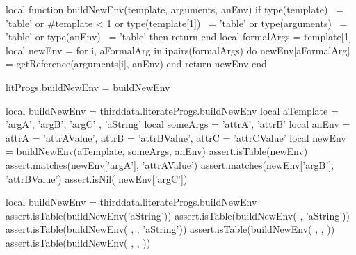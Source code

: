 {{\startLuaCode
local function buildNewEnv(template, arguments, anEnv)
  if type(template)    ~= 'table' or #template  < 1 or
     type(template[1]) ~= 'table' or
     type(arguments)   ~= 'table' or
     type(anEnv)       ~= 'table' then
    return { }
  end
  local formalArgs = template[1]
  local newEnv = { }
  for i, aFormalArg in ipairs(formalArgs) do
    newEnv[aFormalArg] = getReference(arguments[i], anEnv)
  end
  return newEnv
end

litProgs.buildNewEnv = buildNewEnv
\stopLuaCode

\startLuaTest
local buildNewEnv = thirddata.literateProgs.buildNewEnv
local aTemplate = { { 'argA', 'argB', 'argC' }, 'aString' }
local someArgs  = { 'attrA', 'attrB' }
local anEnv     = {
  attrA = 'attrAValue',
  attrB = 'attrBValue',
  attrC = 'attrCValue'
}
local newEnv = buildNewEnv(aTemplate, someArgs, anEnv)
assert.isTable(newEnv)
assert.matches(newEnv['argA'], 'attrAValue')
assert.matches(newEnv['argB'], 'attrBValue')
assert.isNil(  newEnv['argC'])
\stopLuaTest
\stopTestCase

\startLuaTest
local buildNewEnv = thirddata.literateProgs.buildNewEnv
assert.isTable(buildNewEnv('aString'))
assert.isTable(buildNewEnv( { }, 'aString'))
assert.isTable(buildNewEnv( { }, { }, 'aString'))
assert.isTable(buildNewEnv( { }, { }, { }))
assert.isTable(buildNewEnv( { { }}, { }, { }))
\stopLuaTest
\stopTestCase

}}
